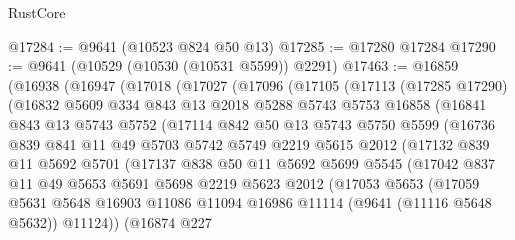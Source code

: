 \begin{lexlean}{RustCore}
\begin{coremodule}
@17284 := @9641 (@10523 @824 @50 @13)
@17285 := @17280 @17284
@17290 := @9641 (@10529 (@10530 (@10531 @5599)) @2291)
@17463 := @16859
    (@16938
      (@16947
        (@17018
          (@17027
            (@17096
              (@17105
                (@17113
                  (@17285 @17290)
                  (@16832
                    @5609
                    @334
                    @843
                    @13
                    @2018
                    @5288
                    @5743
                    @5753
                    @16858
                    (@16841
                      @843
                      @13
                      @5743
                      @5752
                      (@17114
                        @842
                        @50
                        @13
                        @5743
                        @5750
                        @5599
                        (@16736
                          @839
                          @841
                          @11
                          @49
                          @5703
                          @5742
                          @5749
                          @2219
                          @5615
                          @2012
                          (@17132
                            @839
                            @11
                            @5692
                            @5701
                            (@17137
                              @838
                              @50
                              @11
                              @5692
                              @5699
                              @5545
                              (@17042
                                @837
                                @11
                                @49
                                @5653
                                @5691
                                @5698
                                @2219
                                @5623
                                @2012
                                (@17053
                                  @5653
                                  (@17059
                                    @5631
                                    @5648
                                    @16903
                                    @11086
                                    @11094
                                    @16986
                                    @11114
                                    (@9641 (@11116 @5648 @5632))
                                    @11124))
                                (@16874
                                  @227

\end{coremodule}
\end{lexlean}
